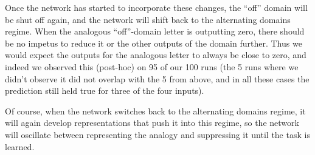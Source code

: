 \documentclass[11pt]{article}
\begin{document}
Once the network has started to incorporate these changes, the ``off'' domain will be shut off again, and the network will shift back to the alternating domains regime. When the analogous ``off''-domain letter is outputting zero, there should be no impetus to reduce it or the other outputs of the domain further. Thus we would expect the outputs for the analogous letter to always be close to zero, and indeed we observed this (post-hoc) on 95 of our 100 runs (the 5 runs where we didn't observe it did not overlap with the 5 from above, and in all these cases the prediction still held true for three of the four inputs). \par 
Of course, when the network switches back to the alternating domains regime, it will again develop representations that push it into this regime, so the network will oscillate between representing the analogy and suppressing it until the task is learned.
\end{document}
